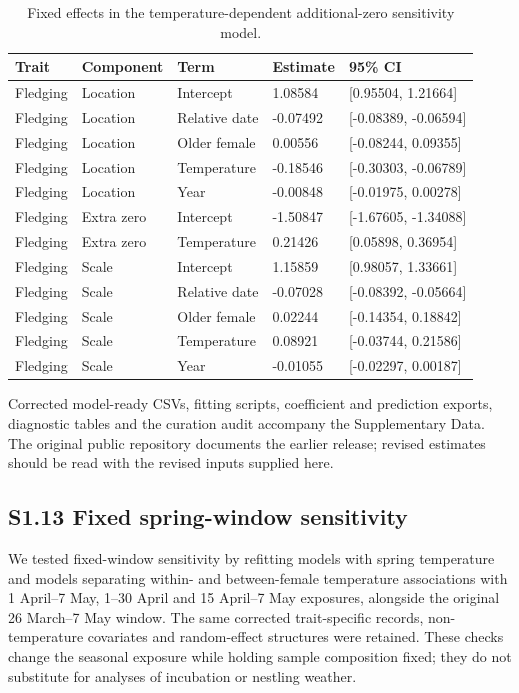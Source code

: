 \documentclass{article}
\begin{document}
\begin{table}[!ht]\centering\scriptsize\singlespacing
\caption{Fixed effects in the temperature-dependent additional-zero sensitivity model.}\label{tab:extra-zero-fixed}
\begin{tabular}{lllll}\toprule
Trait & Component & Term & Estimate & 95\% CI\\\midrule
Fledging & Location & Intercept & 1.08584 & [0.95504, 1.21664]\\
Fledging & Location & Relative date & -0.07492 & [-0.08389, -0.06594]\\
Fledging & Location & Older female & 0.00556 & [-0.08244, 0.09355]\\
Fledging & Location & Temperature & -0.18546 & [-0.30303, -0.06789]\\
Fledging & Location & Year & -0.00848 & [-0.01975, 0.00278]\\
Fledging & Extra zero & Intercept & -1.50847 & [-1.67605, -1.34088]\\
Fledging & Extra zero & Temperature & 0.21426 & [0.05898, 0.36954]\\
Fledging & Scale & Intercept & 1.15859 & [0.98057, 1.33661]\\
Fledging & Scale & Relative date & -0.07028 & [-0.08392, -0.05664]\\
Fledging & Scale & Older female & 0.02244 & [-0.14354, 0.18842]\\
Fledging & Scale & Temperature & 0.08921 & [-0.03744, 0.21586]\\
Fledging & Scale & Year & -0.01055 & [-0.02297, 0.00187]\\
\bottomrule\end{tabular}\end{table}
Corrected model-ready CSVs, fitting scripts, coefficient and prediction exports, diagnostic tables and the curation audit accompany the Supplementary Data. The original public repository documents the earlier release; revised estimates should be read with the revised inputs supplied here.

\subsection{S1.13 Fixed spring-window sensitivity}

We tested fixed-window sensitivity by refitting models with spring temperature and models separating within- and between-female temperature associations with 1 April--7 May, 1--30 April and 15 April--7 May exposures, alongside the original 26 March--7 May window. The same corrected trait-specific records, non-temperature covariates and random-effect structures were retained. These checks change the seasonal exposure while holding sample composition fixed; they do not substitute for analyses of incubation or nestling weather.
\end{document}
